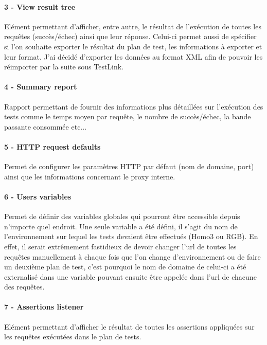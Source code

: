 	\paragraph{3 - View result tree}
	Elément permettant d'afficher, entre autre, le résultat de l'exécution de toutes les requêtes (succès/échec) ainsi que leur réponse. Celui-ci permet aussi de spécifier si l'on souhaite exporter le résultat du plan de test, les informations à exporter et leur format. J'ai décidé d'exporter les données au format XML afin de pouvoir les réimporter par la suite sous TestLink.
	
	\paragraph{4 - Summary report}
	Rapport permettant de fournir des informations plus détaillées sur l'exécution des tests comme le temps moyen par requête, le nombre de succès/échec, la bande passante consommée etc...
	
	\paragraph{5 - HTTP request defaults}
	Permet de configurer les paramètres HTTP par défaut (nom de domaine, port) ainsi que les informations concernant le proxy interne.
	
	\paragraph{6 - Users variables}
	Permet de définir des variables globales qui pourront être accessible depuis n'importe quel endroit. Une seule variable a été défini, il s'agit du nom de l'environnement sur lequel les tests devaient être effectués (Homo3 ou RGB). En effet, il serait extrêmement fastidieux de devoir changer l'url de toutes les requêtes manuellement à chaque fois que l'on change d'environnement ou de faire un deuxième plan de test, c'est pourquoi le nom de domaine de celui-ci a été externalisé dans une variable pouvant ensuite être appelée dans l'url de chacune des requêtes.
	
	\paragraph{7 - Assertions listener}
	Elément permettant d'afficher le résultat de toutes les assertions appliquées sur les requêtes exécutées dans le plan de tests. \\
	

